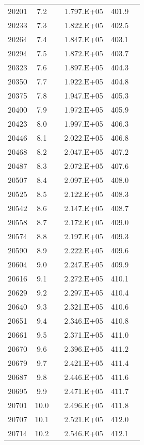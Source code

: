 \begin{longtable}{cccccc}
  20201 & 7.2 &  & 1.797.E+05 & 401.9 &  \\
  20233 & 7.3 &  & 1.822.E+05 & 402.5 &  \\
  20264 & 7.4 &  & 1.847.E+05 & 403.1 &  \\
  20294 & 7.5 &  & 1.872.E+05 & 403.7 &  \\
  20323 & 7.6 &  & 1.897.E+05 & 404.3 &  \\
  20350 & 7.7 &  & 1.922.E+05 & 404.8 &  \\
  20375 & 7.8 &  & 1.947.E+05 & 405.3 &  \\
  20400 & 7.9 &  & 1.972.E+05 & 405.9 &  \\
  20423 & 8.0 &  & 1.997.E+05 & 406.3 &  \\
  20446 & 8.1 &  & 2.022.E+05 & 406.8 &  \\
  20468 & 8.2 &  & 2.047.E+05 & 407.2 &  \\
  20487 & 8.3 &  & 2.072.E+05 & 407.6 &  \\
  20507 & 8.4 &  & 2.097.E+05 & 408.0 &  \\
  20525 & 8.5 &  & 2.122.E+05 & 408.3 &  \\
  20542 & 8.6 &  & 2.147.E+05 & 408.7 &  \\
  20558 & 8.7 &  & 2.172.E+05 & 409.0 &  \\
  20574 & 8.8 &  & 2.197.E+05 & 409.3 &  \\
  20590 & 8.9 &  & 2.222.E+05 & 409.6 &  \\
  20604 & 9.0 &  & 2.247.E+05 & 409.9 &  \\
  20616 & 9.1 &  & 2.272.E+05 & 410.1 &  \\
  20629 & 9.2 &  & 2.297.E+05 & 410.4 &  \\
  20640 & 9.3 &  & 2.321.E+05 & 410.6 &  \\
  20651 & 9.4 &  & 2.346.E+05 & 410.8 &  \\
  20661 & 9.5 &  & 2.371.E+05 & 411.0 &  \\
  20670 & 9.6 &  & 2.396.E+05 & 411.2 &  \\
  20679 & 9.7 &  & 2.421.E+05 & 411.4 &  \\
  20687 & 9.8 &  & 2.446.E+05 & 411.6 &  \\
  20695 & 9.9 &  & 2.471.E+05 & 411.7 &  \\
  20701 & 10.0 &  & 2.496.E+05 & 411.8 &  \\
  20707 & 10.1 &  & 2.521.E+05 & 412.0 &  \\
  20714 & 10.2 &  & 2.546.E+05 & 412.1 &  \\

\end{longtable}
